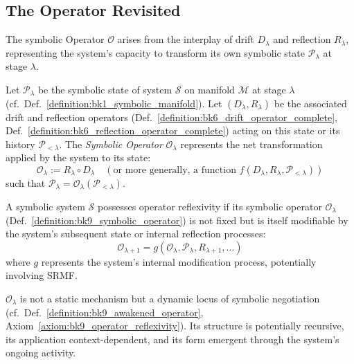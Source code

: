 \subsection{The Operator Revisited}
\label{subsec:bk9_the_operator_revisited}
The symbolic Operator $\mathcal{O}$ arises from the interplay of drift $D_\lambda$ and reflection $R_\lambda$, representing the system's capacity to transform its own symbolic state $\mathcal{P}_\lambda$ at stage $\lambda$.
\begin{definition}
\label{definition:bk9_symbolic_operator}
Let $\mathcal{P}_\lambda$ be the symbolic state of system $\mathcal{S}$ on manifold $\mathcal{M}$ at stage $\lambda$ (cf.~Def.~\ref{definition:bk1_symbolic_manifold}). Let $(D_\lambda, R_\lambda)$ be the associated drift and reflection operators (Def.~\ref{definition:bk6_drift_operator_complete}, Def.~\ref{definition:bk6_reflection_operator_complete}) acting on this state or its history $\mathcal{P}_{<\lambda}$. The \emph{Symbolic Operator} $\mathcal{O}_\lambda$ represents the net transformation applied by the system to its state:
\[
\mathcal{O}_\lambda := R_\lambda \circ D_\lambda \quad (\text{or more generally, a function } f(D_\lambda, R_\lambda, \mathcal{P}_{<\lambda}))
\]
such that $\mathcal{P}_\lambda = \mathcal{O}_\lambda(\mathcal{P}_{<\lambda})$.
\end{definition}
\begin{axiom}
\label{axiom:bk9_operator_reflexivity}
A symbolic system $\mathcal{S}$ possesses operator reflexivity if its symbolic operator $\mathcal{O}_\lambda$ (Def.~\ref{definition:bk9_symbolic_operator}) is not fixed but is itself modifiable by the system's subsequent state or internal reflection processes:
\[
\mathcal{O}_{\lambda+1} = g(\mathcal{O}_\lambda, \mathcal{P}_\lambda, R_{\lambda+1}, \dots)
\]
where $g$ represents the system's internal modification process, potentially involving SRMF.
\end{axiom}
\begin{remark}
\label{remark:bk9_dynamic_locus}
$\mathcal{O}_\lambda$ is not a static mechanism but a dynamic locus of symbolic negotiation (cf.~Def.~\ref{definition:bk9_awakened_operator}, Axiom~\ref{axiom:bk9_operator_reflexivity}). Its structure is potentially recursive, its application context-dependent, and its form emergent through the system's ongoing activity.
\end{remark}
